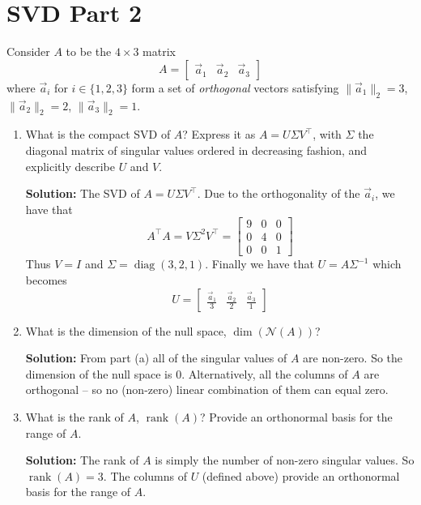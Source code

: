 \documentclass[10pt]{article}
\theoremstyle{definition}
\theoremstyle{plain}
\newcommand{\NN}{\mathcal{N}}
\DeclareMathOperator{\rank}{rank}
\DeclareMathOperator{\diag}{diag}
\begin{document}
\section{SVD Part 2}

Consider $A$ to be the $4 \times 3$ matrix
\begin{equation}
A = \begin{bmatrix} \vec{a}_1 & \vec{a}_2 & \vec{a}_3 \end{bmatrix}
\end{equation}
where $\vec{a}_i$ for $i \in \{1, 2, 3\}$ form a set of \textit{orthogonal} vectors satisfying $\|\vec{a}_1\|_2 = 3$, $\|\vec{a}_2\|_2 = 2$, $\|\vec{a}_3\|_2 = 1$.

\begin{enumerate}[label=(\alph*)]
\item What is the compact SVD of $A$? Express it as $A = U\Sigma V^\top$, with $\Sigma$ the diagonal matrix of singular values ordered in decreasing fashion, and explicitly describe $U$ and $V$.

\textbf{Solution:} The SVD of $A = U\Sigma V^\top$. Due to the orthogonality of the $\vec{a}_i$, we have that
\begin{equation}
A^\top A = V\Sigma^2 V^\top = \begin{bmatrix} 9 & 0 & 0 \\ 0 & 4 & 0 \\ 0 & 0 & 1 \end{bmatrix}
\end{equation}
Thus $V = I$ and $\Sigma = \diag(3, 2, 1)$. Finally we have that $U = A\Sigma^{-1}$ which becomes
\begin{equation}
U = \begin{bmatrix} \frac{\vec{a}_1}{3} & \frac{\vec{a}_2}{2} & \frac{\vec{a}_3}{1} \end{bmatrix}
\end{equation}

\item What is the dimension of the null space, $\dim(\NN(A))$?

\textbf{Solution:} From part (a) all of the singular values of $A$ are non-zero. So the dimension of the null space is 0. Alternatively, all the columns of $A$ are orthogonal -- so no (non-zero) linear combination of them can equal zero.

\item What is the rank of $A$, $\rank(A)$? Provide an orthonormal basis for the range of $A$.

\textbf{Solution:} The rank of $A$ is simply the number of non-zero singular values. So $\rank(A) = 3$. The columns of $U$ (defined above) provide an orthonormal basis for the range of $A$.


\end{enumerate}
\end{document}
